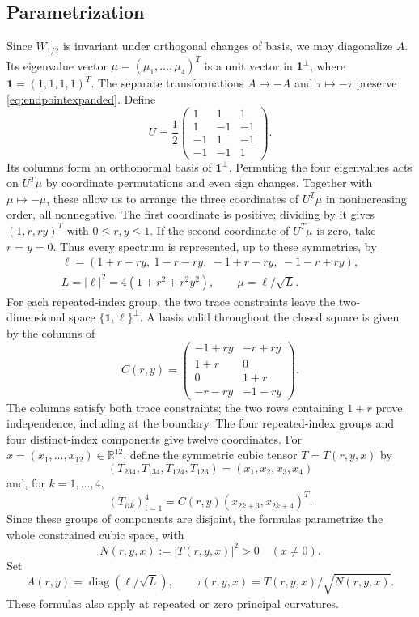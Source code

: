 \documentclass[11pt,a4paper]{amsart}
\numberwithin{equation}{section}
\theoremstyle{definition}
\theoremstyle{remark}
\DeclareMathOperator{\diag}{diag}
\newcommand{\R}{\mathbb R}
\begin{document}
\subsection*{Parametrization}
Since $W_{1/2}$ is invariant under orthogonal changes of basis, we may
diagonalize $A$. Its eigenvalue vector
$\mu=(\mu_1,\ldots,\mu_4)^T$ is a unit vector in
$\boldsymbol1^\perp$, where $\boldsymbol1=(1,1,1,1)^T$.
The separate transformations $A\mapsto-A$ and $\tau\mapsto-\tau$
preserve \eqref{eq:endpointexpanded}. Define
\[
 U=\frac12\begin{pmatrix}
 1&1&1\\ 1&-1&-1\\ -1&1&-1\\ -1&-1&1
 \end{pmatrix}.
\]
Its columns form an orthonormal basis of $\boldsymbol1^\perp$.
Permuting the four eigenvalues acts on $U^T\mu$ by coordinate
permutations and even sign changes. Together with $\mu\mapsto-\mu$,
these allow us to arrange the three coordinates of $U^T\mu$ in
nonincreasing order, all nonnegative. The first coordinate is positive;
dividing by it gives $(1,r,ry)^T$ with $0\le r,y\le1$. If the second
coordinate of $U^T\mu$ is zero, take $r=y=0$. Thus every spectrum is
represented, up to these symmetries, by
\begin{equation}\label{eq:spectralchart}
 \begin{gathered}
 \ell=(1+r+ry,\ 1-r-ry,\ -1+r-ry,\ -1-r+ry),\\
 L=|\ell|^2=4(1+r^2+r^2y^2),\qquad \mu=\ell/\sqrt L.
 \end{gathered}
\end{equation}
For each repeated-index group, the two trace constraints leave the
two-dimensional space $\{\boldsymbol1,\ell\}^\perp$. A basis valid
throughout the closed square is given by the columns of
\begin{equation}\label{eq:cubicchart}
 C(r,y)=\begin{pmatrix}
 -1+ry&-r+ry\\
 1+r&0\\
 0&1+r\\
 -r-ry&-1-ry
 \end{pmatrix}.
\end{equation}
The columns satisfy both trace constraints; the two rows containing
$1+r$ prove independence, including at the boundary. The four
repeated-index groups and four distinct-index components give twelve
coordinates. For $x=(x_1,\ldots,x_{12})\in\R^{12}$, define the symmetric
cubic tensor $T=T(r,y,x)$ by
\[
 (T_{234},T_{134},T_{124},T_{123})=(x_1,x_2,x_3,x_4)
\]
and, for $k=1,\ldots,4$,
\begin{equation}\label{eq:repeatedchart}
 (T_{iik})_{i=1}^4=C(r,y)(x_{2k+3},x_{2k+4})^T.
\end{equation}
Since these groups of components are disjoint, the formulas parametrize
the whole constrained cubic space, with
\[
 N(r,y,x):=|T(r,y,x)|^2>0\quad(x\ne0).
\]
Set
\begin{equation}\label{eq:normalizedchart}
 A(r,y)=\diag(\ell/\sqrt L),\qquad
 \tau(r,y,x)=T(r,y,x)/\sqrt{N(r,y,x)}.
\end{equation}
These formulas also apply at repeated or zero principal curvatures.
\end{document}
